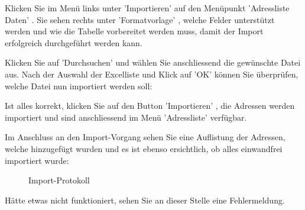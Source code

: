 Klicken Sie im Menü links unter 'Importieren' auf den Menüpunkt 'Adressliste Daten' . Sie sehen rechts unter 'Formatvorlage' , welche Felder unterstützt werden und wie die Tabelle vorbereitet werden muss, damit der Import erfolgreich durchgeführt werden kann.

\vspace{\baselineskip}

Klicken Sie auf 'Durchsuchen'  und wählen Sie anschliessend die gewünschte Datei aus. Nach der Auswahl der Excelliste und Klick auf 'OK' können Sie überprüfen, welche Datei nun importiert werden soll:

\begin{figure}[H]
\end{figure}

Ist alles korrekt, klicken Sie auf den Button 'Importieren' , die Adressen werden importiert und sind anschliessend im Menü 'Adressliste' verfügbar. 

\vspace{\baselineskip}

Im Anschluss an den Import-Vorgang sehen Sie eine Auflistung der Adressen, welche hinzugefügt wurden und es ist ebenso ersichtlich, ob alles einwandfrei importiert wurde:

\begin{figure}[H]
\caption{Import-Protokoll}
\end{figure}

Hätte etwas nicht funktioniert, sehen Sie an dieser Stelle eine Fehlermeldung.